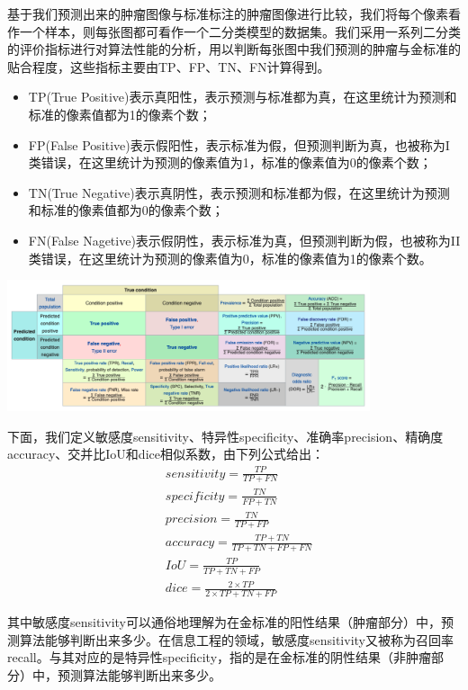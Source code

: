 \documentclass[UTF8]{ctexart}
\begin{document}
    基于我们预测出来的肿瘤图像与标准标注的肿瘤图像进行比较，我们将每个像素看作一个样本，则每张图都可看作一个二分类模型的数据集。我们采用一系列二分类的评价指标进行对算法性能的分析，用以判断每张图中我们预测的肿瘤与金标准的贴合程度，这些指标主要由TP、FP、TN、FN计算得到。
    \begin{itemize}
        \item TP(True Positive)表示真阳性，表示预测与标准都为真，在这里统计为预测和标准的像素值都为1的像素个数；
        \item FP(False Positive)表示假阳性，表示标准为假，但预测判断为真，也被称为I类错误，在这里统计为预测的像素值为1，标准的像素值为0的像素个数；
        \item TN(True Negative)表示真阴性，表示预测和标准都为假，在这里统计为预测和标准的像素值都为0的像素个数；
        \item FN(False Nagetive)表示假阴性，表示标准为真，但预测判断为假，也被称为II类错误，在这里统计为预测的像素值为0，标准的像素值为1的像素个数。
    \end{itemize}
	
	
	\includegraphics[width=0.8\textwidth]{figure/valid.png}
	
	下面，我们定义敏感度sensitivity、特异性specificity、准确率precision、精确度accuracy、交并比IoU和dice相似系数，由下列公式给出：
    \begin{equation}
        \begin{aligned}
            &sensitivity = \frac { TP } { TP + FN } \\
            &specificity = \frac { TN } { FP + TN }\\
            &precision = \frac { TN } { TP + FP } \\
            &accuracy = \frac { TP + TN } { TP + TN + FP + FN }\\
            &IoU = \frac { TP } { TP + TN + FP}\\
            &dice = \frac { 2 \times TP} { 2 \times TP + TN +FP} 
        \end{aligned}
    \end{equation}
	
	其中敏感度sensitivity可以通俗地理解为在金标准的阳性结果（肿瘤部分）中，预测算法能够判断出来多少。在信息工程的领域，敏感度sensitivity又被称为召回率recall。与其对应的是特异性specificity，指的是在金标准的阴性结果（非肿瘤部分）中，预测算法能够判断出来多少。
	
\end{document}
